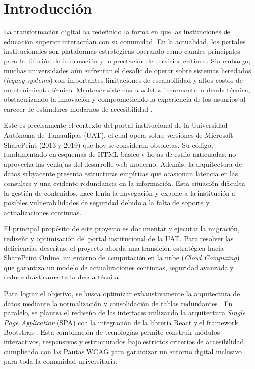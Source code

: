 \section{Introducción}
\label{ch:introduccion}

La transformación digital ha redefinido la forma en que las instituciones de educación superior interactúan con su comunidad. En la actualidad, los portales institucionales son plataformas estratégicas operando como canales principales para la difusión de información y la prestación de servicios críticos \cite{laudon2020}. Sin embargo, muchas universidades aún enfrentan el desafío de operar sobre sistemas heredados (\textit{legacy systems}) con importantes limitaciones de escalabilidad y altos costos de mantenimiento técnico. Mantener sistemas obsoletos incrementa la deuda técnica, obstaculizando la innovación y comprometiendo la experiencia de los usuarios al carecer de estándares modernos de accesibilidad \cite{turban2019}.

Este es precisamente el contexto del portal institucional de la Universidad Autónoma de Tamaulipas (UAT), el cual opera sobre versiones de Microsoft SharePoint (2013 y 2019) que hoy se consideran obsoletas. Su código, fundamentado en esquemas de HTML básico y hojas de estilo anticuadas, no aprovecha las ventajas del desarrollo web moderno. Además, la arquitectura de datos subyacente presenta estructuras empíricas que ocasionan latencia en las consultas y una evidente redundancia en la información. Esta situación dificulta la gestión de contenidos, hace lenta la navegación y expone a la institución a posibles vulnerabilidades de seguridad debido a la falta de soporte y actualizaciones continuas.

El principal propósito de este proyecto es documentar y ejecutar la migración, rediseño y optimización del portal institucional de la UAT. Para resolver las deficiencias descritas, el proyecto aborda una transición estratégica hacia SharePoint Online, un entorno de computación en la nube (\textit{Cloud Computing}) que garantiza un modelo de actualizaciones continuas, seguridad avanzada y reduce drásticamente la deuda técnica \cite{jamshidi2013cloud, microsoft2024sharepoint}.

Para lograr el objetivo, se busca optimizar exhaustivamente la arquitectura de datos mediante la normalización y consolidación de tablas redundantes \cite{silberschatz2020database}. En paralelo, se plantea el rediseño de las interfaces utilizando la arquitectura \textit{Single Page Application} (SPA) con la integración de la librería React \cite{react2024facebook} y el framework Bootstrap \cite{bootstrap2024}. Esta combinación de tecnologías permite construir módulos interactivos, responsivos y estructurados bajo estrictos criterios de accesibilidad, cumpliendo con las Pautas WCAG \cite{w3c2018wcag} para garantizar un entorno digital inclusivo para toda la comunidad universitaria.

